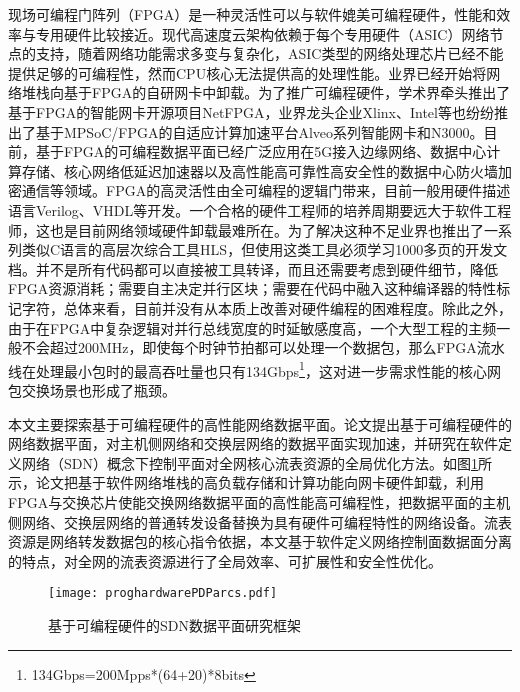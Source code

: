 现场可编程门阵列（FPGA）是一种灵活性可以与软件媲美可编程硬件，性能和效率与专用硬件比较接近。现代高速度云架构依赖于每个专用硬件（ASIC）网络节点的支持，随着网络功能需求多变与复杂化，ASIC类型的网络处理芯片已经不能提供足够的可编程性，然而CPU核心无法提供高的处理性能。业界已经开始将网络堆栈向基于FPGA的自研网卡中卸载。为了推广可编程硬件，学术界牵头推出了基于FPGA的智能网卡开源项目NetFPGA，业界龙头企业Xlinx、Intel等也纷纷推出了基于MPSoC/FPGA的自适应计算加速平台Alveo系列智能网卡和N3000。目前，基于FPGA的可编程数据平面已经广泛应用在5G接入边缘网络、数据中心计算存储、核心网络低延迟加速器以及高性能高可靠性高安全性的数据中心防火墙加密通信等领域。FPGA的高灵活性由全可编程的逻辑门带来，目前一般用硬件描述语言Verilog、VHDL等开发。一个合格的硬件工程师的培养周期要远大于软件工程师，这也是目前网络领域硬件卸载最难所在。为了解决这种不足业界也推出了一系列类似C语言的高层次综合工具HLS，但使用这类工具必须学习1000多页的开发文档。并不是所有代码都可以直接被工具转译，而且还需要考虑到硬件细节，降低FPGA资源消耗；需要自主决定并行区块；需要在代码中融入这种编译器的特性标记字符，总体来看，目前并没有从本质上改善对硬件编程的困难程度。除此之外，由于在FPGA中复杂逻辑对并行总线宽度的时延敏感度高，一个大型工程的主频一般不会超过200MHz，即使每个时钟节拍都可以处理一个数据包，那么FPGA流水线在处理最小包时的最高吞吐量也只有134Gbps\footnote{134Gbps=200Mpps*(64+20)*8bits}，这对进一步需求性能的核心网包交换场景也形成了瓶颈。

\label{chap12}

本文主要探索基于可编程硬件的高性能网络数据平面。论文提出基于可编程硬件的网络数据平面，对主机侧网络和交换层网络的数据平面实现加速，并研究在软件定义网络（SDN）概念下控制平面对全网核心流表资源的全局优化方法。如图\ref{fig:proghardwarePDParcs}所示，论文把基于软件网络堆栈的高负载存储和计算功能向网卡硬件卸载，利用FPGA与交换芯片使能交换网络数据平面的高性能高可编程性，把数据平面的主机侧网络、交换层网络的普通转发设备替换为具有硬件可编程特性的网络设备。流表资源是网络转发数据包的核心指令依据，本文基于软件定义网络控制面数据面分离的特点，对全网的流表资源进行了全局效率、可扩展性和安全性优化。

\begin{figure}[!ht]
	\centering
	\texttt{[image: proghardwarePDParcs.pdf]}
	\caption{基于可编程硬件的SDN数据平面研究框架} \label{fig:proghardwarePDParcs}
\end{figure}

